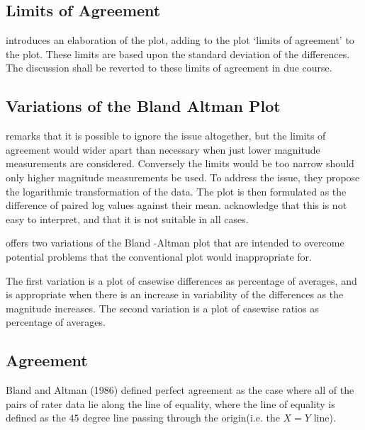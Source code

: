\documentclass[Chap1main.tex]{subfiles}
\begin{document}
\subsection{Limits of Agreement}
\citet{BA86} introduces an elaboration of the plot, adding to the
plot `limits of agreement' to the plot. These limits are based
upon the standard deviation of the differences. The discussion
shall be reverted to these limits of agreement in due course.

\subsection{Variations of the Bland Altman Plot}
\citet{BA99} remarks that it is possible to ignore the issue
altogether, but the limits of agreement would wider apart than
necessary when just lower magnitude measurements are considered.
Conversely the limits would be too narrow should only higher
magnitude measurements be used. To address the issue, they propose
the logarithmic transformation of the data. The plot is then
formulated as the difference of paired log values against their
mean. \citet{BA99} acknowledge that this is not easy to interpret,
and that it is not suitable in all cases.

\citet{BA99} offers two variations of the Bland -Altman plot that
are intended to overcome potential problems that the conventional
plot would inappropriate for.

The first variation is a plot of casewise differences as
percentage of averages, and is appropriate when there is an
increase in variability of the differences as the magnitude
increases. The second variation is a plot of casewise ratios as
percentage of averages.







\subsection{Agreement} Bland and Altman (1986) defined perfect
agreement as the case where all of the pairs of rater data lie
along the line of equality, where the line of equality is defined
as the $45$ degree line passing through the origin(i.e. the $X=Y$
line).
\end{document}
